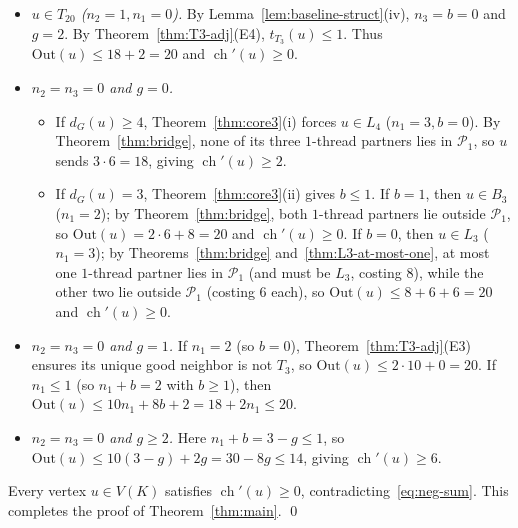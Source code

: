 \documentclass[11pt,a4paper]{article}
\theoremstyle{definition}
\newcommand{\ch}{\operatorname{ch}}
\newcommand{\Ppoor}{\mathcal{P}_1}
\begin{document}
\begin{enumerate}[leftmargin=*,itemsep=3pt]
\begin{itemize}[leftmargin=*,itemsep=2pt]
    \item \emph{$u \in T_{20}$ ($n_2 = 1, n_1 = 0$).} By Lemma~\ref{lem:baseline-struct}(iv), $n_3 = b = 0$ and $g = 2$. By Theorem~\ref{thm:T3-adj}(E4), $t_{T_3}(u) \le 1$. Thus $\mathrm{Out}(u) \le 18 + 2 = 20$ and $\ch'(u) \ge 0$.
    \item \emph{$n_2 = n_3 = 0$ and $g = 0$.}
      \begin{itemize}[leftmargin=*,itemsep=1pt]
        \item If $d_G(u) \ge 4$, Theorem~\ref{thm:core3}(i) forces $u \in L_4$ ($n_1 = 3, b = 0$). By Theorem~\ref{thm:bridge}, none of its three $1$-thread partners lies in $\Ppoor$, so $u$ sends $3 \cdot 6 = 18$, giving $\ch'(u) \ge 2$.
        \item If $d_G(u) = 3$, Theorem~\ref{thm:core3}(ii) gives $b \le 1$. If $b = 1$, then $u \in B_3$ ($n_1 = 2$); by Theorem~\ref{thm:bridge}, both $1$-thread partners lie outside $\Ppoor$, so $\mathrm{Out}(u) = 2 \cdot 6 + 8 = 20$ and $\ch'(u) \ge 0$. If $b = 0$, then $u \in L_3$ ($n_1 = 3$); by Theorems~\ref{thm:bridge} and~\ref{thm:L3-at-most-one}, at most one $1$-thread partner lies in $\Ppoor$ (and must be $L_3$, costing $8$), while the other two lie outside $\Ppoor$ (costing $6$ each), so $\mathrm{Out}(u) \le 8 + 6 + 6 = 20$ and $\ch'(u) \ge 0$.
      \end{itemize}
    \item \emph{$n_2 = n_3 = 0$ and $g = 1$.} If $n_1 = 2$ (so $b = 0$), Theorem~\ref{thm:T3-adj}(E3) ensures its unique good neighbor is not $T_3$, so $\mathrm{Out}(u) \le 2 \cdot 10 + 0 = 20$. If $n_1 \le 1$ (so $n_1 + b = 2$ with $b \ge 1$), then $\mathrm{Out}(u) \le 10 n_1 + 8 b + 2 = 18 + 2 n_1 \le 20$.
    \item \emph{$n_2 = n_3 = 0$ and $g \ge 2$.} Here $n_1 + b = 3 - g \le 1$, so $\mathrm{Out}(u) \le 10(3 - g) + 2g = 30 - 8g \le 14$, giving $\ch'(u) \ge 6$.
  \end{itemize}
\end{enumerate}

Every vertex $u \in V(K)$ satisfies $\ch'(u) \ge 0$, contradicting~\eqref{eq:neg-sum}. This completes the proof of Theorem~\ref{thm:main}. \qed
\end{document}

